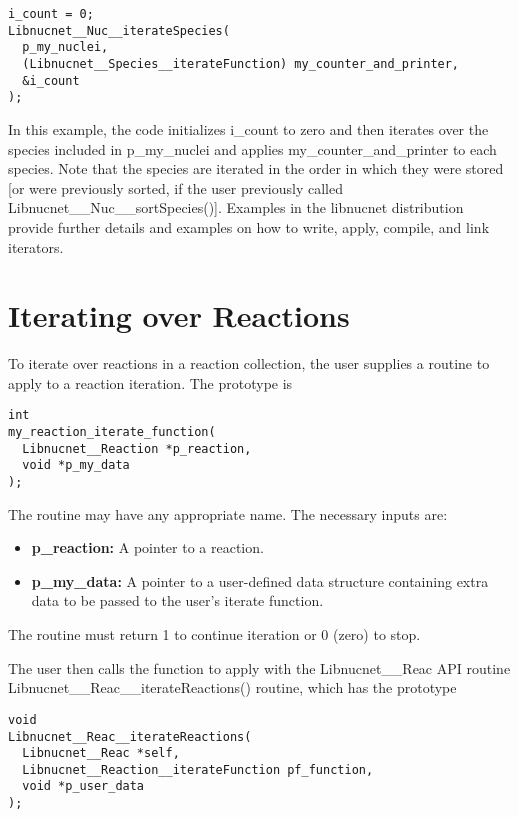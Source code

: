 \documentclass{article}    %
\begin{document}
\begin{verbatim}
i_count = 0;
Libnucnet__Nuc__iterateSpecies(
  p_my_nuclei,
  (Libnucnet__Species__iterateFunction) my_counter_and_printer,
  &i_count
);
\end{verbatim}

In this example, the code initializes i\_count to zero and then iterates
over the species included in p\_my\_nuclei and applies my\_counter\_and\_printer
to each species.  Note that the species are iterated in the order in which
they were stored [or were previously sorted, if the user previously called
Libnucnet\_\_Nuc\_\_sortSpecies()].
Examples in the libnucnet distribution provide further
details and examples on how to write, apply, compile, and link iterators.

\section{Iterating over Reactions} 

To iterate over reactions in a reaction collection,
the user supplies a routine to apply to a
reaction iteration.  The prototype is

\begin{verbatim}
int
my_reaction_iterate_function(
  Libnucnet__Reaction *p_reaction,
  void *p_my_data
);
\end{verbatim}

\noindent The routine may have any appropriate name.  The necessary inputs are:

\begin{itemize}

\item {\bf p\_reaction:}  A pointer to a reaction.

\item {\bf p\_my\_data:}  A pointer to a user-defined data structure containing
extra data to be passed to the user's iterate function.

\end{itemize}

\noindent
The routine must return 1 to continue iteration or 0 (zero) to stop.

The user then calls the function to apply with the Libnucnet\_\_Reac API
routine Libnucnet\_\_Reac\_\_iterateReactions() routine, which has the prototype

\begin{verbatim}
void
Libnucnet__Reac__iterateReactions(
  Libnucnet__Reac *self,
  Libnucnet__Reaction__iterateFunction pf_function,
  void *p_user_data
);
\end{verbatim}
\end{document}

